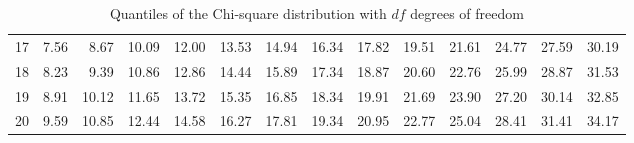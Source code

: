 \begin{table}[ht]
\begin{tabular}{rrrrrrrrrrrrrr}
  17 & 7.56 & 8.67 & 10.09 & 12.00 & 13.53 & 14.94 & 16.34 & 17.82 & 19.51 & 21.61 & 24.77 & 27.59 & 30.19 \\ 
  18 & 8.23 & 9.39 & 10.86 & 12.86 & 14.44 & 15.89 & 17.34 & 18.87 & 20.60 & 22.76 & 25.99 & 28.87 & 31.53 \\ 
  19 & 8.91 & 10.12 & 11.65 & 13.72 & 15.35 & 16.85 & 18.34 & 19.91 & 21.69 & 23.90 & 27.20 & 30.14 & 32.85 \\ 
  20 & 9.59 & 10.85 & 12.44 & 14.58 & 16.27 & 17.81 & 19.34 & 20.95 & 22.77 & 25.04 & 28.41 & 31.41 & 34.17 \\ 
   \hline
\end{tabular}
\caption{Quantiles of the Chi-square distribution with $df$ degrees of freedom} 
\end{table}
